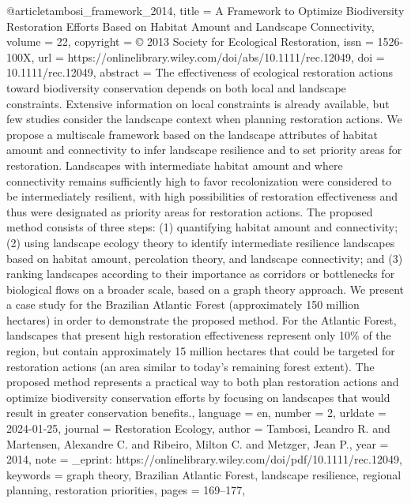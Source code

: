 {{{@article{tambosi_framework_2014,
	title = {A {Framework} to {Optimize} {Biodiversity} {Restoration} {Efforts} {Based} on {Habitat} {Amount} and {Landscape} {Connectivity}},
	volume = {22},
	copyright = {© 2013 Society for Ecological Restoration},
	issn = {1526-100X},
	url = {https://onlinelibrary.wiley.com/doi/abs/10.1111/rec.12049},
	doi = {10.1111/rec.12049},
	abstract = {The effectiveness of ecological restoration actions toward biodiversity conservation depends on both local and landscape constraints. Extensive information on local constraints is already available, but few studies consider the landscape context when planning restoration actions. We propose a multiscale framework based on the landscape attributes of habitat amount and connectivity to infer landscape resilience and to set priority areas for restoration. Landscapes with intermediate habitat amount and where connectivity remains sufficiently high to favor recolonization were considered to be intermediately resilient, with high possibilities of restoration effectiveness and thus were designated as priority areas for restoration actions. The proposed method consists of three steps: (1) quantifying habitat amount and connectivity; (2) using landscape ecology theory to identify intermediate resilience landscapes based on habitat amount, percolation theory, and landscape connectivity; and (3) ranking landscapes according to their importance as corridors or bottlenecks for biological flows on a broader scale, based on a graph theory approach. We present a case study for the Brazilian Atlantic Forest (approximately 150 million hectares) in order to demonstrate the proposed method. For the Atlantic Forest, landscapes that present high restoration effectiveness represent only 10\% of the region, but contain approximately 15 million hectares that could be targeted for restoration actions (an area similar to today's remaining forest extent). The proposed method represents a practical way to both plan restoration actions and optimize biodiversity conservation efforts by focusing on landscapes that would result in greater conservation benefits.},
	language = {en},
	number = {2},
	urldate = {2024-01-25},
	journal = {Restoration Ecology},
	author = {Tambosi, Leandro R. and Martensen, Alexandre C. and Ribeiro, Milton C. and Metzger, Jean P.},
	year = {2014},
	note = {\_eprint: https://onlinelibrary.wiley.com/doi/pdf/10.1111/rec.12049},
	keywords = {graph theory, Brazilian Atlantic Forest, landscape resilience, regional planning, restoration priorities},
	pages = {169--177},
}

}}}
